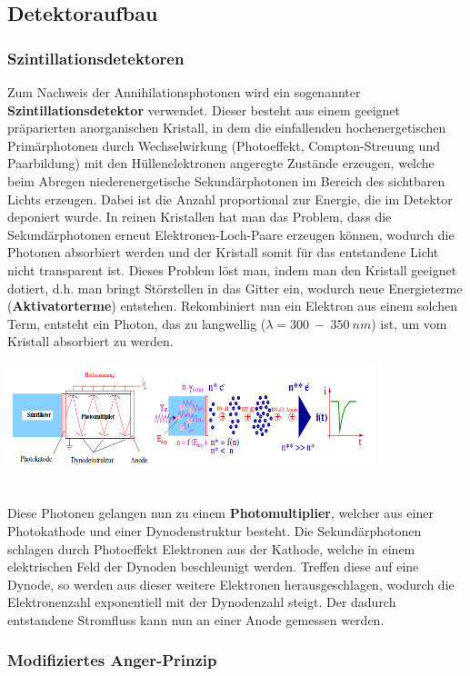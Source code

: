 \subsection{Detektoraufbau}
\subsubsection{Szintillationsdetektoren}
	Zum Nachweis der Annihilationsphotonen wird ein sogenannter \textbf{Szintillationsdetektor} verwendet. Dieser besteht aus einem geeignet präparierten anorganischen Kristall, in dem die einfallenden hochenergetischen Primärphotonen durch Wechselwirkung (Photoeffekt, Compton-Streuung und Paarbildung) mit den Hüllenelektronen angeregte Zustände erzeugen, welche beim Abregen niederenergetische Sekundärphotonen im Bereich des sichtbaren Lichts erzeugen. Dabei ist die Anzahl proportional zur Energie, die im Detektor deponiert wurde. In reinen Kristallen hat man das Problem, dass die Sekundärphotonen erneut Elektronen-Loch-Paare erzeugen können, wodurch die Photonen absorbiert werden und der Kristall somit für das entstandene Licht nicht transparent ist. Dieses Problem löst man, indem man den Kristall geeignet dotiert, d.h. man bringt Störstellen in das Gitter ein, wodurch neue Energieterme (\textbf{Aktivatorterme}) entstehen. Rekombiniert nun ein Elektron aus einem solchen Term, entsteht ein Photon, das zu langwellig ($\lambda = 300\ -\ 350\ \unit{nm}$) ist, um vom Kristall absorbiert zu werden.\\
	\minipanf
				\begin{center}
					\includegraphics[width=0.8\textwidth, height=0.2\textheight]{pic/szintillator.png}
					\label{PET-Prinzip}
				\end{center}
	\minipend 
	\hspace{5mm}\\
	Diese Photonen gelangen nun zu einem \textbf{Photomultiplier}, welcher aus einer Photokathode und einer Dynodenstruktur besteht. Die Sekundärphotonen schlagen durch  Photoeffekt Elektronen aus der Kathode, welche in einem elektrischen Feld der Dynoden beschleunigt werden. Treffen diese auf eine Dynode, so werden aus dieser weitere Elektronen herausgeschlagen, wodurch die Elektronenzahl exponentiell mit der Dynodenzahl steigt. Der dadurch entstandene Stromfluss kann nun an einer Anode gemessen werden.\cite{info}

		
\subsubsection{Modifiziertes Anger-Prinzip}